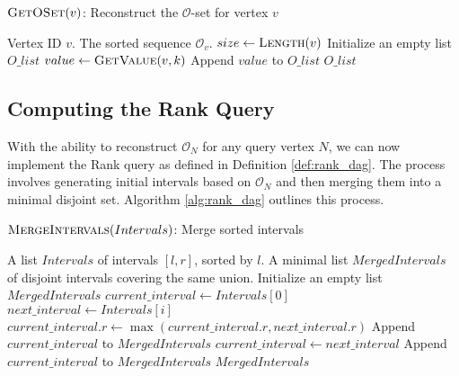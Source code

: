 \begin{algorithm}
    \caption{$\textsc{GetOSet}(v)$: Reconstruct the $\mathcal{O}$-set for vertex $v$}
    \label{alg:get_o_set}
    \small
    \begin{algorithmic}[1]
        \Require Vertex ID $v$.
        \Ensure The sorted sequence $\mathcal{O}_v$.
        \State $size \gets \textsc{Length}(v)$
        \State Initialize an empty list $O\_list$
        \State $value \gets \textsc{GetValue}(v, k)$
        \State Append $value$ to $O\_list$
        \EndFor
        \State \Return $O\_list$ 
    \end{algorithmic}
\end{algorithm}

\subsection{Computing the Rank Query}
\label{subsec:computing_rank}

With the ability to reconstruct $\mathcal{O}_N$ for any query vertex $N$, we can now implement the Rank query as defined in Definition \ref{def:rank_dag}. The process involves generating initial intervals based on $\mathcal{O}_N$ and then merging them into a minimal disjoint set. Algorithm \ref{alg:rank_dag} outlines this process.

\begin{algorithm}
    \caption{$\textsc{MergeIntervals}(Intervals)$: Merge sorted intervals}
    \label{alg:merge_intervals}
    \small
    \begin{algorithmic}[1]
        \Require A list $Intervals$ of intervals $[l, r]$, sorted by $l$.
        \Ensure A minimal list $MergedIntervals$ of disjoint intervals covering the same union.
        \State Initialize an empty list $MergedIntervals$
        \State $current\_interval \gets Intervals[0]$
        \State $next\_interval \gets Intervals[i]$
        \State $current\_interval.r \gets \max(current\_interval.r, next\_interval.r)$
        \Else
        \State Append $current\_interval$ to $MergedIntervals$
        \State $current\_interval \gets next\_interval$
        \EndIf
        \EndFor
        \State Append $current\_interval$ to $MergedIntervals$
        \EndIf
        \State \Return $MergedIntervals$
    \end{algorithmic}
\end{algorithm}

